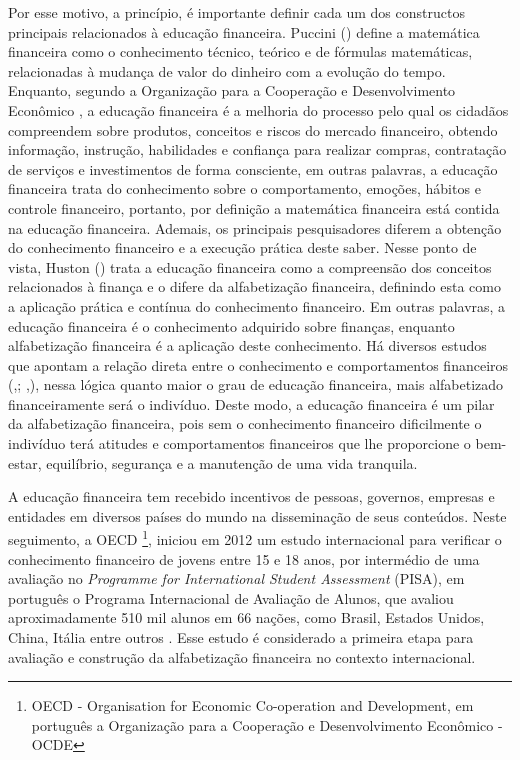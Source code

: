Por esse motivo, a princípio, é importante definir cada um dos constructos principais relacionados à educação financeira. Puccini (\citeyear{puccini2011}) define a matemática financeira como o conhecimento técnico, teórico e de fórmulas matemáticas, relacionadas à mudança de valor do dinheiro com a evolução do tempo. Enquanto, segundo a Organização para a Cooperação e Desenvolvimento Econômico \cite{oecd2005}, a educação financeira é a melhoria do processo pelo qual os cidadãos compreendem sobre produtos, conceitos e riscos do mercado financeiro, obtendo informação, instrução, habilidades e confiança para realizar compras, contratação de serviços e investimentos de forma consciente, em outras palavras, a educação financeira trata do conhecimento sobre o comportamento, emoções, hábitos e controle financeiro, portanto, por definição a matemática financeira está contida na educação financeira. Ademais, os principais pesquisadores diferem a obtenção do conhecimento financeiro e a execução prática deste saber. Nesse ponto de vista, Huston (\citeyear{huston2010}) trata a educação financeira como a compreensão dos conceitos relacionados à finança e o difere da alfabetização financeira, definindo esta como a aplicação prática e contínua do conhecimento financeiro. Em outras palavras, a educação financeira é o conhecimento adquirido sobre finanças, enquanto alfabetização financeira é a aplicação deste conhecimento. Há diversos estudos que apontam a relação direta entre o conhecimento e comportamentos financeiros (\citeauthor{atkinson2012},\citeyear{atkinson2012}; \citeauthor{lusardi2015},\citeyear{lusardi2015}), nessa lógica quanto maior o grau de educação financeira, mais alfabetizado financeiramente será o indivíduo. Deste modo, a educação financeira é um pilar da alfabetização financeira, pois sem o conhecimento financeiro dificilmente o indivíduo terá atitudes e comportamentos financeiros que lhe proporcione o bem-estar, equilíbrio, segurança e a manutenção de uma vida tranquila.

A educação financeira tem recebido incentivos de pessoas, governos, empresas e entidades em diversos países do mundo na disseminação de seus conteúdos. Neste seguimento, a OECD \footnote{OECD - Organisation for Economic Co-operation and Development, em português a Organização para a Cooperação e Desenvolvimento Econômico - OCDE}, iniciou em 2012 um estudo internacional para verificar o conhecimento financeiro de jovens entre 15 e 18 anos, por intermédio de uma avaliação no \textit{Programme for International Student Assessment} (PISA), em português o Programa Internacional de Avaliação de Alunos, que avaliou aproximadamente 510 mil alunos em 66 nações, como Brasil, Estados Unidos, China, Itália entre outros \cite{oecd2015}. Esse estudo é considerado a primeira etapa para avaliação e construção da alfabetização financeira no contexto internacional.

